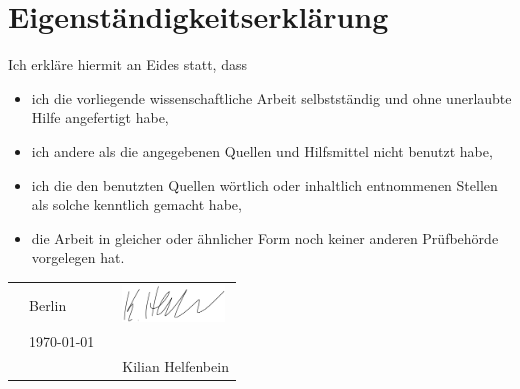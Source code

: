 
\section*{Eigenständigkeitserklärung}

\vspace{1cm}

Ich erkläre hiermit an Eides statt, dass

\begin{itemize}
	\item ich die vorliegende wissenschaftliche Arbeit selbstständig und ohne unerlaubte Hilfe angefertigt habe,
	\item ich andere als die angegebenen Quellen und Hilfsmittel nicht benutzt habe,
	\item ich die den benutzten Quellen wörtlich oder inhaltlich entnommenen Stellen als solche kenntlich gemacht habe, 
	\item die Arbeit in gleicher oder ähnlicher Form noch keiner anderen Prüfbehörde vorgelegen hat.
\end{itemize}

\vspace{1cm}

\begin{tabular}{p{10mm}>{\centering\arraybackslash}p{50mm}p{10mm}>{\centering\arraybackslash}p{50mm}}
	&	{\large Berlin}	&	&	\includegraphics[height=1cm]{Bilder/my_signature}								\\
	&	{\large \today}	& 	&	\hrulefill 						\\
	&					&	&	{\small Kilian Helfenbein}	
\end{tabular}

\newpage